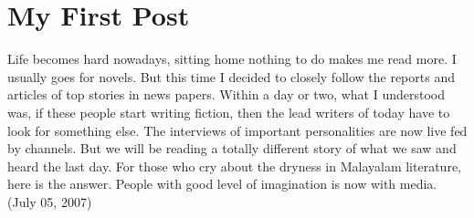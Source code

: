 \section*{My First Post}
\vskip 2pt


Life becomes hard nowadays, sitting home nothing to do makes me read more.
I usually goes for novels. But this time I decided to closely follow the 
reports and articles of top stories in news papers. Within a day or two, 
what I understood was, if these people start writing fiction, then the 
lead writers of today have to look for something else. The interviews of 
important personalities are now live fed by channels. But we will be reading
 a totally different story of what we saw and heard the last day.
For those who cry about the dryness in Malayalam literature, here is the answer. 
People with good level of imagination is now with media. (July 05, 2007)
\newpage
